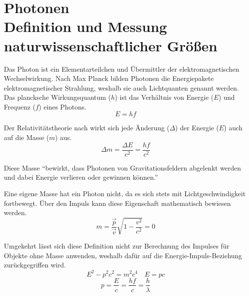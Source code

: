 \section[Photonen\hfill Definition und Messung naturwissenschaftlicher Größen]{Photonen\\{\normalsize Definition und Messung naturwissenschaftlicher Größen}}
Das Photon ist ein Elementarteilchen und Übermittler der elektromagnetischen Wechselwirkung. Nach Max Planck bilden Photonen die Energiepakete elektromagnetischer Strahlung, weshalb sie auch Lichtquanten genannt werden. Das plancksche Wirkungsquantum ($h$) ist das Verhältnis von Energie ($E$) und Frequenz ($f$) eines Photons.
$$E=hf$$
\begin{vardef}
\end{vardef}

Der Relativitätstheorie nach wirkt sich jede Änderung ($\Delta$) der Energie ($E$) auch auf die Masse ($m$) aus.
$${\Delta}m = \frac{{\Delta}E}{c^2} = \frac{hf}{c^2}$$
\begin{vardef}
\end{vardef}

Diese Masse \enquote{bewirkt, dass Photonen von Gravitationsfeldern abgelenkt werden und dabei Energie verlieren oder gewinnen können.} \cite{ulm:photon}

Eine eigene Masse hat ein Photon nicht, da es sich stets mit Lichtgeschwindigkeit fortbewegt. Über den Impuls kann diese Eigenschaft mathematisch bewiesen werden.
$$m = \frac{\vec{p}}{\vec{v}}\sqrt{1-\frac{v^2}{c^2}} = 0$$
\begin{vardef}
\end{vardef}

Umgekehrt lässt sich diese Definition nicht zur Berechnung des Impulses für Objekte ohne Masse anwenden, weshalb dafür auf die Energie-Impuls-Beziehung zurückgegriffen wird.
$$E^2-p^2c^2 = m^2c^4 \quad E=pc$$
$$p=\frac{E}{c}=\frac{hf}{c}=\frac{h}{\lambda}$$
\begin{vardef}
\end{vardef}


